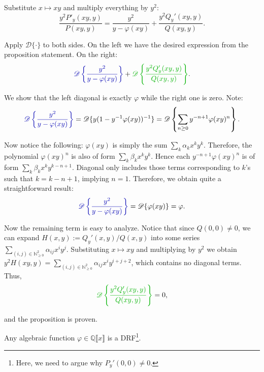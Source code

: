 \documentclass{template}
\begin{document}
Substitute $x \mapsto xy$ and multiply everything by $y^2$:
\begin{equation*}
    \frac{y^2P'_y(xy,y)}{P(xy,y)} = \frac{y^2}{y-\varphi(xy)} + \frac{y^2Q_y'(xy,y)}{Q(xy,y)}.
\end{equation*}

Apply $\mathcal{D}\{\cdot\}$ to both sides. On the left we have the desired expression from the proposition statement. 
On the right:
\begin{equation*}
    \textcolor{blue!70!black}{\mathcal{D}\left\{ \frac{y^2}{y-\varphi(xy)} \right\}} + \textcolor{green!70!black}{\mathcal{D}\left\{ \frac{y^2Q_y'(xy,y)}{Q(xy,y)} \right\}}.
\end{equation*}

We show that the left diagonal is exactly $\varphi$ while the right one is zero. Note:
\begin{align*}
    \textcolor{blue!70!black}{\mathcal{D}\left\{ \frac{y^2}{y-\varphi(xy)} \right\}} = \mathcal{D}\{y(1-y^{-1}\varphi(xy))^{-1}\} = \mathcal{D}\left\{ \sum_{n \geq 0} y^{-n+1}\varphi(xy)^n \right\}.
\end{align*}

Now notice the following: $\varphi(xy)$ is simply the sum $\sum_k \alpha_kx^ky^k$. Therefore, the polynomial $\varphi(xy)^n$ is also of form $\sum_k \beta_kx^ky^k$.
Hence each $y^{-n+1}\varphi(xy)^n$ is of form $\sum_k \beta_kx^ky^{k-n+1}$. 
Diagonal only includes those terms corresponding to $k$'s such that $k = k-n+1$, implying $n=1$. 
Therefore, we obtain quite a straightforward result:
\begin{equation*}
    \textcolor{blue!70!black}{\mathcal{D}\left\{ \frac{y^2}{y-\varphi(xy)} \right\}} = \mathcal{D}\{\varphi(xy)\} = \varphi.
\end{equation*}

Now the remaining term is easy to analyze. Notice that since $Q(0,0) \neq 0$, we can expand $H(x,y) := Q_y'(x,y)/Q(x,y)$ into some series $\sum_{(i,j) \in \mathbb{N}_{\geq 0}^2}\alpha_{ij}x^iy^j$.
Substituting $x \mapsto xy$ and multiplying by $y^2$ we obtain $y^2H(xy,y) = \sum_{(i,j) \in \mathbb{N}_{\geq 0}^2}\alpha_{ij}x^iy^{i+j+2}$, which contains no diagonal terms.
Thus, 
\begin{equation*}
    \textcolor{green!70!black}{\mathcal{D}\left\{ \frac{y^2Q_y'(xy,y)}{Q(xy,y)} \right\}} = 0,
\end{equation*}

and the proposition is proven.

\begin{proposition}[Corollary]
    Any algebraic function $\varphi \in \mathbb{Q}\llbracket x \rrbracket$ is a DRF\footnote{Here, we need to argue why $P_y'(0,0) \neq 0$.}.
\end{proposition}
\end{document}
